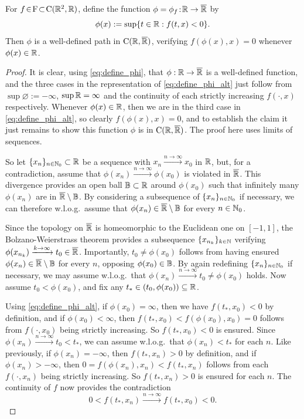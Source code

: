 \begin{lemma}\label{lem:zeros1}
    For $f\!\in\!\mathrm{F}\!\subset\!\mathrm{C}(\mathbb{R}^2,\mathbb{R})$, define the function $\phi=\phi_f\!:\!\mathbb{R}\to{\overline{\mathbb{R}}}$ by
    \begin{equation}\label{eq:define_phi}
    \phi(x) := \sup\{t\in\mathbb{R}: f(t,x) <0 \}.
    \end{equation}
    Then $\phi$ is a well-defined path in $\mathrm{C}(\mathbb{R},{\overline{\mathbb{R}}})$, verifying $f(\phi(x),x)=0$ whenever $\phi(x)\in\mathbb{R}$.
\end{lemma}
\begin{proof}
    It is clear, using \autoref{eq:define_phi}, that $\phi:\mathbb{R}\to{\overline{\mathbb{R}}}$ is a well-defined function, and the three cases in the representation of \autoref{eq:define_phi_alt} just follow from $\sup\varnothing:=-\infty$, $\sup\mathbb{R}=\infty$ and the continuity of each strictly increasing $f(\cdot,x)$ respectively. Whenever $\phi(x)\in\mathbb{R}$, then we are in the third case in \autoref{eq:define_phi_alt}, so clearly $f(\phi(x),x)=0$, and to establish the claim it just remains to show this function $\phi$ is in $\mathrm{C}(\mathbb{R},{\overline{\mathbb{R}}})$. The proof here uses limits of sequences.

    So let $\{x_n\}_{n\in\mathbb{N}_0}\subset\mathbb{R}$ be a sequence with $x_n\xrightarrow{n\to\infty}x_0$ in $\mathbb{R}$, but, for a contradiction, assume that $\phi(x_n)\xrightarrow{n\to\infty}\phi(x_0)$ is violated in ${\overline{\mathbb{R}}}$. This divergence provides an open ball $\mathbb{B}\subset\mathbb{R}$ around $\phi(x_0)$ such that infinitely many $\phi(x_n)$ are in ${\overline{\mathbb{R}}}\setminus\mathbb{B}$. By considering a subsequence of $\{x_n\}_{n\in\mathbb{N}_0}$ if necessary, we can therefore w.l.o.g.~assume that $\phi(x_n)\in{\overline{\mathbb{R}}}\setminus\mathbb{B}$ for every $n\in\mathbb{N}_0$.

    Since the topology on ${\overline{\mathbb{R}}}$ is homeomorphic to the Euclidean one on $[-1,1]$, the Bolzano-Weierstrass theorem provides a subsequence $\{x_{n_k}\}_{k\in\mathbb{N}}$ verifying $\phi(x_{n_k})\xrightarrow{k\to\infty}t_0\in{\overline{\mathbb{R}}}$. Importantly, $t_0\neq\phi(x_0)$ follows from having ensured $\phi(x_n)\in{\overline{\mathbb{R}}}\setminus\mathbb{B}$ for every $n$, opposing $\phi(x_0)\in\mathbb{B}$. By again redefining $\{x_n\}_{n\in\mathbb{N}_0}$ if necessary, we may assume w.l.o.g.~that $\phi(x_n)\xrightarrow{n\to\infty}t_0\neq\phi(x_0)$ holds. Now assume $t_0<\phi(x_0)$, and fix any $t_*\in(t_0,\phi(x_0))\subseteq\mathbb{R}$.

    Using \autoref{eq:define_phi_alt}, if $\phi(x_0)=\infty$, then we have $f(t_*,x_0)<0$ by definition, and if $\phi(x_0)<\infty$, then $f(t_*,x_0)<f(\phi(x_0),x_0)=0$ follows from $f(\cdot,x_0)$ being strictly increasing. So $f(t_*,x_0)<0$ is ensured. Since $\phi(x_n)\xrightarrow{n\to\infty}t_0<t_*$, we can assume w.l.o.g.~that $\phi(x_n)<t_*$ for each $n$. Like previously, if $\phi(x_n)=-\infty$, then $f(t_*,x_n)>0$ by definition, and if $\phi(x_n)>-\infty$, then $0=f(\phi(x_n),x_n)<f(t_*,x_n)$ follows from each $f(\cdot,x_n)$ being strictly increasing. So $f(t_*,x_n)>0$ is ensured for each $n$. The continuity of $f$ now provides the contradiction
    \begin{equation}
        0<f(t_*,x_n)\xrightarrow{n\to\infty}f(t_*,x_0)<0.
    \end{equation}


\end{proof}
